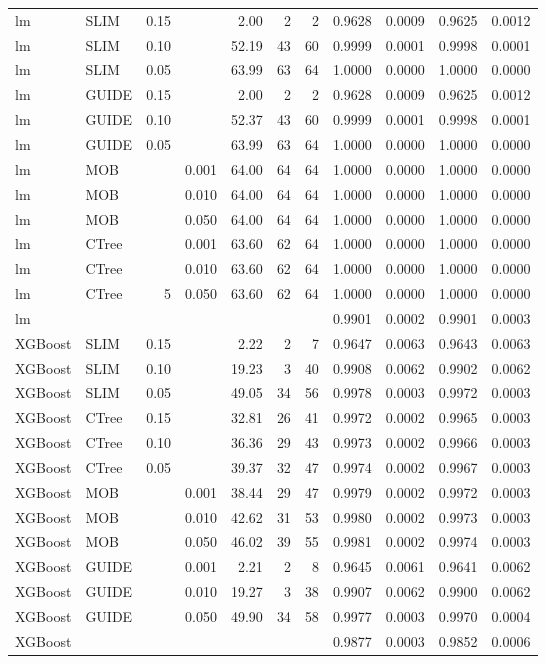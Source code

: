 \begin{table}[!htb]
\begin{tabular}[t]{l|l|r|r|r|r|r|r|r|r|r}
\hline
lm & SLIM & 0.15 & & 2.00 & 2 & 2 & 0.9628 & 0.0009 & 0.9625 & 0.0012\\
lm & SLIM & 0.10 & & 52.19 & 43 & 60 & 0.9999 & 0.0001 & 0.9998 & 0.0001\\
lm & SLIM & 0.05 & & 63.99 & 63 & 64 & 1.0000 & 0.0000 & 1.0000 & 0.0000\\
lm & GUIDE & 0.15 &  & 2.00 & 2 & 2 & 0.9628 & 0.0009 & 0.9625 & 0.0012\\
lm & GUIDE & 0.10 &  & 52.37 & 43 & 60 & 0.9999 & 0.0001 & 0.9998 & 0.0001\\
lm & GUIDE & 0.05 & & 63.99 & 63 & 64 & 1.0000 & 0.0000 & 1.0000 & 0.0000\\
lm & MOB & & 0.001 & 64.00 & 64 & 64 & 1.0000 & 0.0000 & 1.0000 & 0.0000\\
lm & MOB & & 0.010 & 64.00 & 64 & 64 & 1.0000 & 0.0000 & 1.0000 & 0.0000\\
lm & MOB & & 0.050 & 64.00 & 64 & 64 & 1.0000 & 0.0000 & 1.0000 & 0.0000\\
lm & CTree & & 0.001 & 63.60 & 62 & 64 & 1.0000 & 0.0000 & 1.0000 & 0.0000\\
lm & CTree & & 0.010 & 63.60 & 62 & 64 & 1.0000 & 0.0000 & 1.0000 & 0.0000\\
lm & CTree &5 & 0.050 & 63.60 & 62 & 64 & 1.0000 & 0.0000 & 1.0000 & 0.0000\\
\hline
lm & & & & & & & 0.9901 & 0.0002 & 0.9901 & 0.0003\\
\hline



XGBoost & SLIM & 0.15 & & 2.22 & 2 & 7 & 0.9647 & 0.0063 & 0.9643 & 0.0063\\
XGBoost & SLIM & 0.10 & & 19.23 & 3 & 40 & 0.9908 & 0.0062 & 0.9902 & 0.0062\\
XGBoost & SLIM & 0.05 & & 49.05 & 34 & 56 & 0.9978 & 0.0003 & 0.9972 & 0.0003\\
XGBoost & CTree & 0.15 & & 32.81 & 26 & 41 & 0.9972 & 0.0002 & 0.9965 & 0.0003\\
XGBoost & CTree & 0.10 & & 36.36 & 29 & 43 & 0.9973 & 0.0002 & 0.9966 & 0.0003\\
XGBoost & CTree & 0.05 & & 39.37 & 32 & 47 & 0.9974 & 0.0002 & 0.9967 & 0.0003\\
XGBoost & MOB & & 0.001 & 38.44 & 29 & 47 & 0.9979 & 0.0002 & 0.9972 & 0.0003\\
XGBoost & MOB & & 0.010 & 42.62 & 31 & 53 & 0.9980 & 0.0002 & 0.9973 & 0.0003\\
XGBoost & MOB & & 0.050 & 46.02 & 39 & 55 & 0.9981 & 0.0002 & 0.9974 & 0.0003\\
XGBoost & GUIDE & & 0.001 & 2.21 & 2 & 8 & 0.9645 & 0.0061 & 0.9641 & 0.0062\\
XGBoost & GUIDE & & 0.010 & 19.27 & 3 & 38 & 0.9907 & 0.0062 & 0.9900 & 0.0062\\
XGBoost & GUIDE & & 0.050 & 49.90 & 34 & 58 & 0.9977 & 0.0003 & 0.9970 & 0.0004\\
\hline
XGBoost & & & & & & & 0.9877 & 0.0003 & 0.9852 & 0.0006\\
\hline


\end{tabular}
\end{table}
